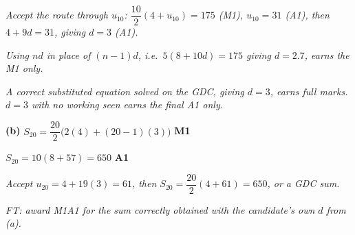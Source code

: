 \documentclass[12pt, twoside]{article}
\begin{document}
\begin{enumerate}[itemsep=0.3cm]
\emph{Accept the route through $u_{10}$:
$\dfrac{10}{2}(4 + u_{10}) = 175$ (M1), $u_{10} = 31$ (A1), then
$4 + 9d = 31$, giving $d = 3$ (A1).}

\emph{Using $nd$ in place of $(n - 1)d$, i.e.\ $5(8 + 10d) = 175$ giving
$d = 2.7$, earns the M1 only.}

\emph{A correct substituted equation solved on the GDC, giving $d = 3$,
earns full marks. $d = 3$ with no working seen earns the final A1 only.}

\medskip

\textbf{(b)} $S_{20} = \dfrac{20}{2}\bigl(2(4) + (20 - 1)(3)\bigr)$
\hfill \textbf{M1}

$S_{20} = 10(8 + 57) = 650$ \hfill \textbf{A1}

\emph{Accept $u_{20} = 4 + 19(3) = 61$, then
$S_{20} = \dfrac{20}{2}(4 + 61) = 650$, or a GDC sum.}

\emph{FT: award M1A1 for the sum correctly obtained with the candidate's
own $d$ from (a).}

\end{enumerate}
\end{document}
